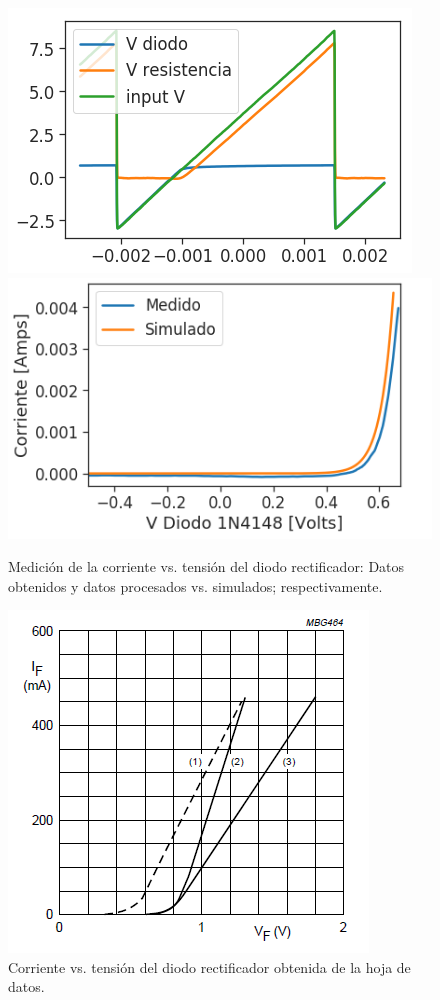 \begin{figure}[H]
\centering
\includegraphics[scale=0.5]{../EJ1/DiodoRectificador/datosOsciloscopio}
\includegraphics[scale=0.5]{../EJ1/DiodoRectificador/rectificadorSuperpos}
\caption{Medici\'on de la corriente vs. tensi\'on del diodo rectificador: Datos obtenidos y datos procesados vs. simulados; respectivamente.}
\label{med1b}
\end{figure}

\begin{figure}[H]
\centering
\includegraphics[scale=0.8]{../EJ1/DiodoRectificador/corrienteDiodoDatasheet}
\caption{Corriente vs. tensi\'on del diodo rectificador obtenida de la hoja de datos.}
\label{med1c}
\end{figure}

